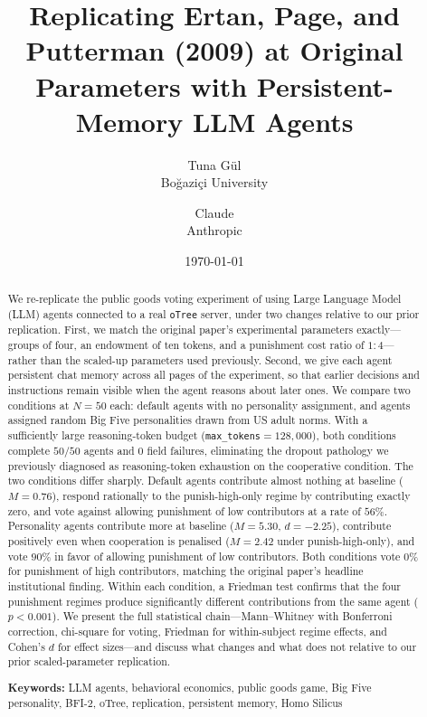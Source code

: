 \documentclass[12pt, a4paper]{article}
\title{Replicating Ertan, Page, and Putterman (2009) at Original Parameters with Persistent-Memory LLM Agents}
\author{%
  Tuna G\"ul\\
  Bo\u{g}azi\c{c}i University
  \and
  Claude\\
  Anthropic
}
\date{\today}
\begin{document}
\maketitle

\begin{abstract}
We re-replicate the public goods voting experiment of \citet{ertan2009who} using Large Language Model (LLM) agents connected to a real \texttt{oTree} server, under two changes relative to our prior replication. First, we match the original paper's experimental parameters exactly---groups of four, an endowment of ten tokens, and a punishment cost ratio of $1{:}4$---rather than the scaled-up parameters used previously. Second, we give each agent persistent chat memory across all pages of the experiment, so that earlier decisions and instructions remain visible when the agent reasons about later ones. We compare two conditions at $N=50$ each: default agents with no personality assignment, and agents assigned random Big Five personalities drawn from US adult norms. With a sufficiently large reasoning-token budget (\texttt{max\_tokens}$=128{,}000$), both conditions complete $50/50$ agents and $0$ field failures, eliminating the dropout pathology we previously diagnosed as reasoning-token exhaustion on the cooperative condition. The two conditions differ sharply. Default agents contribute almost nothing at baseline ($M=0.76$), respond rationally to the punish-high-only regime by contributing exactly zero, and vote against allowing punishment of low contributors at a rate of $56\%$. Personality agents contribute more at baseline ($M=5.30$, $d=-2.25$), contribute positively even when cooperation is penalised ($M=2.42$ under punish-high-only), and vote $90\%$ in favor of allowing punishment of low contributors. Both conditions vote $0\%$ for punishment of high contributors, matching the original paper's headline institutional finding. Within each condition, a Friedman test confirms that the four punishment regimes produce significantly different contributions from the same agent ($p<0.001$). We present the full statistical chain---Mann--Whitney with Bonferroni correction, chi-square for voting, Friedman for within-subject regime effects, and Cohen's $d$ for effect sizes---and discuss what changes and what does not relative to our prior scaled-parameter replication.

\medskip
\noindent\textbf{Keywords:} LLM agents, behavioral economics, public goods game, Big Five personality, BFI-2, oTree, replication, persistent memory, Homo Silicus
\end{abstract}
\end{document}
